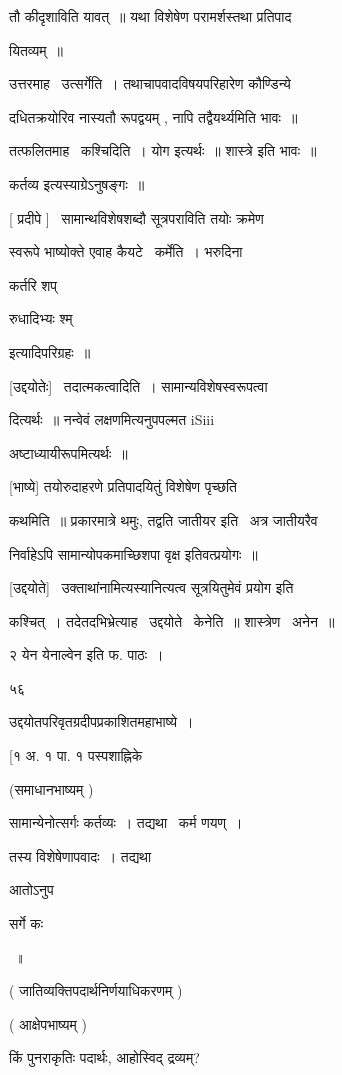 \documentclass[11pt, openany]{book}
\begin{document}
तौ कीदृशाविति यावत्~॥ यथा विशेषेण परामर्शस्तथा प्रतिपाद \textendash\ 

यितव्यम्~॥ 

उत्तरमाह \textendash\ उत्सर्गेति~। तथाचापवादविषयपरिहारेण कौण्डिन्ये 

दधितक्रयोरिव नास्यतौ रूपद्वयम् , नापि तद्वैयर्थ्यमिति भावः~॥ 

तत्फलितमाह \textendash\ कश्चिदिति~। योग इत्यर्थः~॥ शास्त्रे इति भावः~॥ 

कर्तव्य इत्यस्याग्रेऽनुषङ्गः~॥ 

[ प्रदीपे ] \textendash\ सामान्थविशेषशब्दौ सूत्रपराविति तयोः क्रमेण 

स्वरूपे भाष्योक्ते एवाह कैयटे \textendash\ कर्मेति~। भरुदिना {\qt कर्तरि शप्

रुधादिभ्यः श्म्} इत्यादिपरिग्रहः~॥ 

[उद्दयोतेः] \textendash\ तदात्मकत्वादिति~। सामान्यविशेषस्वरूपत्वा \textendash\ 

दित्यर्थः~॥ नन्वेवं लक्षणमित्यनुपपल्मत iSiii 

अष्टाध्यायीरूपमित्यर्थः~॥ 

[भाष्ये] तयोरुदाहरणे प्रतिपादयितुं विशेषेण पृच्छति \textendash\ 

कथमिति~॥ प्रकारमात्रे थमुः, तद्वति जातीयर इति \textendash\ अत्र जातीयरैव 

निर्वाहेऽपि सामान्योपकमाच्छिशपा वृक्ष इतिवत्प्रयोगः~॥ 

[उद्दयोते] \textendash\ उक्ताथांनामित्यस्यानित्यत्व सूत्रयितुमेवं प्रयोग इति 

कश्चित्~। तदेतदभिभ्रेत्याह \textendash\ उद्दयोते \textendash\ केनेति~॥ शास्त्रेण \textendash\ अनेन~॥ 







२ {\qt येन येनाल्वेन} इति फ. पाठः~। 

५६ 

उद्दयोतपरिवृतग्रदीपप्रकाशितमहाभाष्ये~। 

[१ अ. १ पा. १ पस्पशाह्निके 

(समाधानभाष्यम् ) 

सामान्येनोत्सर्गः कर्तव्यः~। तद्यथा \textendash\ {\qt कर्म णयण्~।}

तस्य विशेषेणापवादः~। तद्यथा \textendash\ {\qt आतोऽनुप \textendash\ 

सर्गे कः}~॥ 

( जातिव्यक्तिपदार्थनिर्णयाधिकरणम् ) 

( आक्षेपभाष्यम् ) 

किं पुनराकृतिः पदार्थः, आहोस्विद् द्रव्यम्? 
\end{document}
